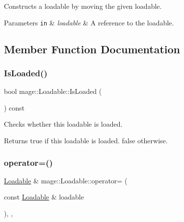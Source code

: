 Constructs a loadable by moving the given loadable.


\begin{DoxyParams}[1]{Parameters}
\mbox{\tt in}  & {\em loadable} & A reference to the loadable. \\
\hline
\end{DoxyParams}


\subsection{Member Function Documentation}
\hypertarget{classmage_1_1_loadable_ae5489e70602ed829212b420b2e354108}{}\label{classmage_1_1_loadable_ae5489e70602ed829212b420b2e354108} 
\subsubsection{\texorpdfstring{Is\+Loaded()}{IsLoaded()}}
{\footnotesize\ttfamily bool mage\+::\+Loadable\+::\+Is\+Loaded (\begin{DoxyParamCaption}{ }\end{DoxyParamCaption}) const\hspace{0.3cm}{\ttfamily [noexcept]}}

Checks whether this loadable is loaded.

\begin{DoxyReturn}{Returns}
{\ttfamily true} if this loadable is loaded. {\ttfamily false} otherwise. 
\end{DoxyReturn}
\hypertarget{classmage_1_1_loadable_a3474428ce8f4b183f121cecf8f2c8add}{}\label{classmage_1_1_loadable_a3474428ce8f4b183f121cecf8f2c8add} 
\subsubsection{\texorpdfstring{operator=()}{operator=()}\hspace{0.1cm}{\footnotesize\ttfamily [1/2]}}
{\footnotesize\ttfamily \hyperlink{classmage_1_1_loadable}{Loadable} \& mage\+::\+Loadable\+::operator= (\begin{DoxyParamCaption}\item[{const \hyperlink{classmage_1_1_loadable}{Loadable} \&}]{loadable }\end{DoxyParamCaption})\hspace{0.3cm}{\ttfamily [protected]}, {\ttfamily [default]}, {\ttfamily [noexcept]}}

